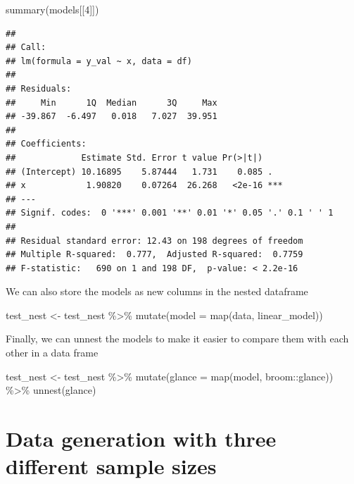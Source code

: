 \documentclass[
]{book}
\newenvironment{Shaded}{\begin{snugshade}}{\end{snugshade}}
\newcommand{\AttributeTok}[1]{\textcolor[rgb]{0.77,0.63,0.00}{#1}}
\newcommand{\DecValTok}[1]{\textcolor[rgb]{0.00,0.00,0.81}{#1}}
\newcommand{\FunctionTok}[1]{\textcolor[rgb]{0.00,0.00,0.00}{#1}}
\newcommand{\NormalTok}[1]{#1}
\newcommand{\OtherTok}[1]{\textcolor[rgb]{0.56,0.35,0.01}{#1}}
\newcommand{\SpecialCharTok}[1]{\textcolor[rgb]{0.00,0.00,0.00}{#1}}
\begin{document}
\begin{Shaded}
\begin{Highlighting}[]
\FunctionTok{summary}\NormalTok{(models[[}\DecValTok{4}\NormalTok{]])}
\end{Highlighting}
\end{Shaded}

\begin{verbatim}
## 
## Call:
## lm(formula = y_val ~ x, data = df)
## 
## Residuals:
##     Min      1Q  Median      3Q     Max 
## -39.867  -6.497   0.018   7.027  39.951 
## 
## Coefficients:
##             Estimate Std. Error t value Pr(>|t|)    
## (Intercept) 10.16895    5.87444   1.731    0.085 .  
## x            1.90820    0.07264  26.268   <2e-16 ***
## ---
## Signif. codes:  0 '***' 0.001 '**' 0.01 '*' 0.05 '.' 0.1 ' ' 1
## 
## Residual standard error: 12.43 on 198 degrees of freedom
## Multiple R-squared:  0.777,  Adjusted R-squared:  0.7759 
## F-statistic:   690 on 1 and 198 DF,  p-value: < 2.2e-16
\end{verbatim}

We can also store the models as new columns in the nested dataframe

\begin{Shaded}
\begin{Highlighting}[]
\NormalTok{test\_nest }\OtherTok{\textless{}{-}}\NormalTok{ test\_nest }\SpecialCharTok{\%\textgreater{}\%} 
  \FunctionTok{mutate}\NormalTok{(}\AttributeTok{model =} \FunctionTok{map}\NormalTok{(data, linear\_model))}
\end{Highlighting}
\end{Shaded}

Finally, we can unnest the models to make it easier to compare them with each other in a data frame

\begin{Shaded}
\begin{Highlighting}[]
\NormalTok{test\_nest }\OtherTok{\textless{}{-}}\NormalTok{ test\_nest }\SpecialCharTok{\%\textgreater{}\%} 
  \FunctionTok{mutate}\NormalTok{(}\AttributeTok{glance =} \FunctionTok{map}\NormalTok{(model, broom}\SpecialCharTok{::}\NormalTok{glance)) }\SpecialCharTok{\%\textgreater{}\%} 
  \FunctionTok{unnest}\NormalTok{(glance)}
\end{Highlighting}
\end{Shaded}

\hypertarget{data-generation-with-three-different-sample-sizes}{%
\section{Data generation with three different sample sizes}\label{data-generation-with-three-different-sample-sizes}}
\end{document}
